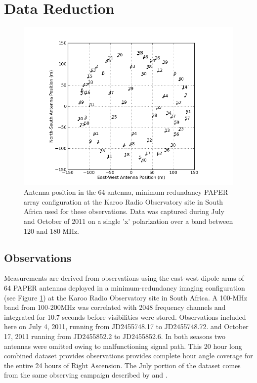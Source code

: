 \documentclass[preprint]{aastex}
\begin{document}
 
 \section{Data Reduction}
 \label{sec:Observations}


\begin{figure}\centering
\includegraphics[width=0.85\columnwidth]{plots/antpos.png}
\caption{Antenna position in the 64-antenna, minimum-redundancy PAPER array configuration at the Karoo Radio Observatory site in South Africa used for these observations.
Data was captured during July and October of 2011 on a single 'x' polarization over a band between 120 and 180 MHz.
}\label{fig:antpos}
\end{figure}

\subsection{Observations}

 Measurements are derived from observations using  the east-west dipole arms of
64 PAPER antennas deployed in a minimum-redundancy imaging configuration
(see Figure \ref{fig:antpos})
at the Karoo Radio Observatory site in South Africa.
A 100-MHz band from 100-200MHz was correlated
with 2048 frequency channels and integrated for 10.7 seconds before
visibilities were stored.  Observations included here on  July 4, 2011, running
from JD2455748.17 to JD2455748.72. and October 17, 2011 running from
JD2455852.2 to JD2455852.6.  In both seasons two antennas were omitted owing to
malfunctioning signal path. This 20 hour long combined dataset provides
observations provides complete hour angle coverage for the entire 24 hours of
Right Ascension. The July portion of the dataset comes from the same observing
campaign described by \cite{Pober:2013p9567} and \cite{Stefan:2012p9707}. 
\end{document}
